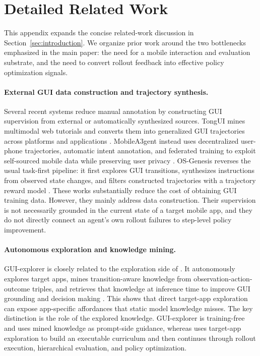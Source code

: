 \section{Detailed Related Work}
\label{sec:related}

This appendix expands the concise related-work discussion in Section~\ref{sec:introduction}. We organize prior work around the two bottlenecks emphasized in the main paper: the need for a mobile interaction and evaluation substrate, and the need to convert rollout feedback into effective policy optimization signals.

\paragraph{External GUI data construction and trajectory synthesis.}
Several recent systems reduce manual annotation by constructing GUI supervision from external or automatically synthesized sources. TongUI mines multimodal web tutorials and converts them into generalized GUI trajectories across platforms and applications \citep{zhang2025tongui}. MobileA3gent instead uses decentralized user-phone trajectories, automatic intent annotation, and federated training to exploit self-sourced mobile data while preserving user privacy \citep{wang2025mobilea3gent}. OS-Genesis reverses the usual task-first pipeline: it first explores GUI transitions, synthesizes instructions from observed state changes, and filters constructed trajectories with a trajectory reward model \citep{sun2025genesis}. These works substantially reduce the cost of obtaining GUI training data. However, they mainly address data construction. Their supervision is not necessarily grounded in the current state of a target mobile app, and they do not directly connect an agent's own rollout failures to step-level policy improvement.

\paragraph{Autonomous exploration and knowledge mining.}
GUI-explorer is closely related to the exploration side of \ourmethod. It autonomously explores target apps, mines transition-aware knowledge from observation-action-outcome triples, and retrieves that knowledge at inference time to improve GUI grounding and decision making \citep{xie2025gui}. This shows that direct target-app exploration can expose app-specific affordances that static model knowledge misses. The key distinction is the role of the explored knowledge. GUI-explorer is training-free and uses mined knowledge as prompt-side guidance, whereas \ourmethod uses target-app exploration to build an executable curriculum and then continues through rollout execution, hierarchical evaluation, and policy optimization.

